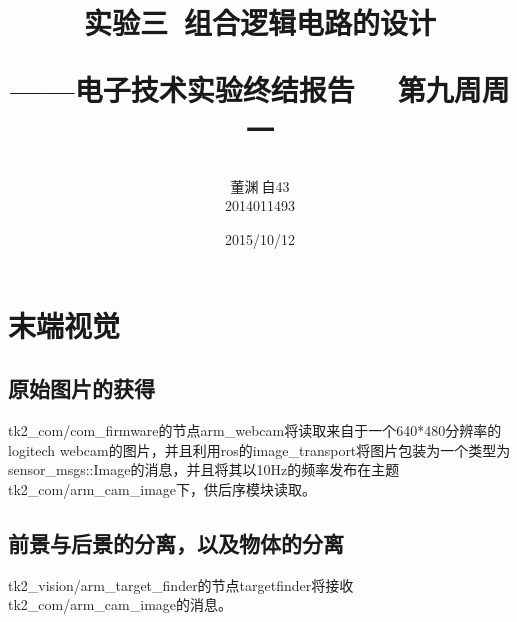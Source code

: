 \documentclass[a4paper,12pt]{article}
\author{董渊$\:$自43\\2014011493}
\title{实验三\ 组合逻辑电路的设计 \\
	\begin{flushright}
		\begin{large}
			——电子技术实验终结报告 \ \  第九周周一
		\end{large}
	\end{flushright}}
\date{2015/10/12 }
\begin{document}
\begin{spacing}{1}
\maketitle
\end{spacing}

\section{末端视觉}
\subsection{原始图片的获得}
tk2\_com/com\_firmware的节点arm\_webcam将读取来自于一个640*480分辨率的logitech webcam的图片，并且利用ros的image\_transport将图片包装为一个类型为sensor\_msgs::Image的消息，并且将其以10Hz的频率发布在主题tk2\_com/arm\_cam\_image下，供后序模块读取。
\subsection{前景与后景的分离，以及物体的分离}
tk2\_vision/arm\_target\_finder的节点targetfinder将接收tk2\_com/arm\_cam\_image的消息。
\end{document}
